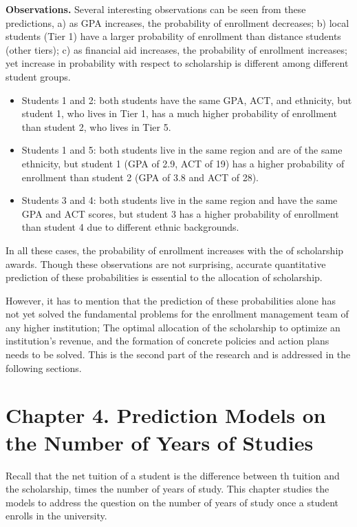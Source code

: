 \documentclass[12pt,english]{report}
\begin{document}
\vspace{0.15in}
\noindent \textbf{Observations.} Several interesting observations can be seen from these predictions, a) as GPA  increases, the probability of enrollment decreases; b) local students (Tier 1)  have a larger probability of enrollment than distance students (other tiers);  c) as financial aid increases, the probability of enrollment increases; yet  increase in probability with respect to scholarship is different among  different student groups.

\begin{itemize}
\item	Students 1 and 2: both students have the same GPA, ACT, and ethnicity, but student 1, who lives in Tier 1, has a much higher probability of enrollment than student 2, who lives in Tier 5.
\item Students 1 and 5: both students live in the same region and are of the same ethnicity, but student 1 (GPA of 2.9, ACT of 19) has a higher probability of enrollment than student 2 (GPA of 3.8 and ACT of 28).
\item Students 3 and 4: both students live in the same region and have the same GPA and ACT scores, but student 3 has a higher probability of enrollment than student 4 due to different ethnic backgrounds.
\end{itemize}

In all these cases, the probability of enrollment increases with the of scholarship awards. Though these observations are not surprising, accurate  quantitative prediction of these probabilities is essential to the allocation  of scholarship.

However, it has to mention that the prediction of these probabilities alone  has not yet solved the fundamental problems for the enrollment management team  of any higher institution;  The optimal allocation of the scholarship to  optimize an institution's revenue, and the formation of concrete policies and  action plans needs to be solved. This is the second part of the research and  is addressed in the following sections.


\chapter {Chapter 4. Prediction Models on the Number of Years of Studies}
Recall that the net tuition of a student is the difference between th tuition and the scholarship, times the number of years of study.    This chapter studies the models to address the question on the number of years of study once a student enrolls in the university. 
\end{document}
